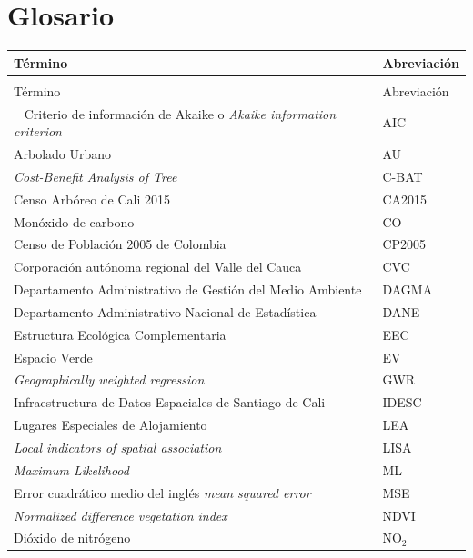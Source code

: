 \documentclass[12pt,a4paper,oneside, openany]{book}
\theoremstyle{definition}
\theoremstyle{definition}
\theoremstyle{definition}
\theoremstyle{remark}
\begin{document}

\chapter*{Glosario}\label{glosario}

\begin{longtable}{>{\raggedright\arraybackslash}p{10cm}l}
\toprule
Término & Abreviación\\
\midrule
\endfirsthead
\multicolumn{2}{@{}l}{\textit{(continúa)}}\\
\toprule
Término & Abreviación\\
\midrule
\endhead
\
\endfoot
\bottomrule
\endlastfoot
\rowcolor{gray!6}  Criterio de información de Akaike o \textit{Akaike information criterion} & AIC\\
Arbolado Urbano & AU\\
\rowcolor{gray!6}  \textit{Cost-Benefit Analysis of Tree} & C-BAT\\
Censo Arbóreo de Cali 2015 & CA2015\\
\rowcolor{gray!6}  Monóxido de carbono & CO\\
\addlinespace
Censo de Población 2005 de Colombia & CP2005\\
\rowcolor{gray!6}  Corporación autónoma regional del Valle del Cauca & CVC\\
Departamento Administrativo de Gestión del Medio Ambiente & DAGMA\\
\rowcolor{gray!6}  Departamento Administrativo Nacional de Estadística & DANE\\
Estructura Ecológica Complementaria & EEC\\
\addlinespace
\rowcolor{gray!6}  Espacio Verde & EV\\
\textit{Geographically weighted regression} & GWR\\
\rowcolor{gray!6}  Infraestructura de Datos Espaciales de Santiago de Cali & IDESC\\
Lugares Especiales de Alojamiento & LEA\\
\rowcolor{gray!6}  \textit{Local indicators of spatial association} & LISA\\
\addlinespace
\textit{Maximum Likelihood} & ML\\
\rowcolor{gray!6}  Error cuadrático medio del inglés \textit{mean squared error} & MSE\\
\textit{Normalized difference vegetation index} & NDVI\\
\rowcolor{gray!6}  Dióxido de nitrógeno & NO$_2$\\

\end{longtable}
\end{document}
